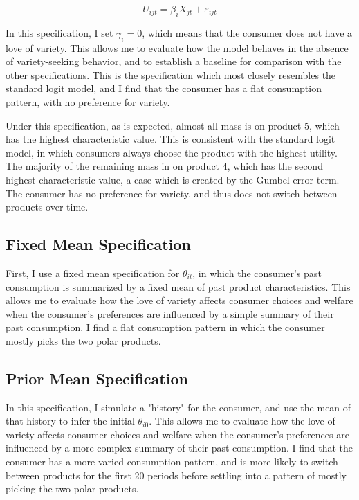 \documentclass[12pt]{article}
\begin{document}
    \begin{equation}
      U_{ijt} = \beta_i X_{jt} + \varepsilon_{ijt}
    \end{equation}

    In this specification, I set $\gamma_i = 0$, which means that the consumer does not have a love of variety. This allows me to evaluate how the model behaves in the absence of variety-seeking behavior, and to establish a baseline for comparison with the other specifications. This is the specification which most closely resembles the standard logit model, and I find that the consumer has a flat consumption pattern, with no preference for variety.

    Under this specification, as is expected, almost all mass is on product 5, which has the highest characteristic value. This is consistent with the standard logit model, in which consumers always choose the product with the highest utility. The majority of the remaining mass in on product 4, which has the second highest characteristic value, a case which is created by the Gumbel error term. The consumer has no preference for variety, and thus does not switch between products over time.

    \subsection{Fixed Mean Specification}
    First, I use a fixed mean specification for $\theta_{it}$, in which the consumer's past consumption is summarized by a fixed mean of past product characteristics. This allows me to evaluate how the love of variety affects consumer choices and welfare when the consumer's preferences are influenced by a simple summary of their past consumption. I find a flat consumption pattern in which the consumer mostly picks the two polar products.

    \subsection{Prior Mean Specification}
    In this specification, I simulate a "history" for the consumer, and use the mean of that history to infer the initial $\theta_{i0}$. This allows me to evaluate how the love of variety affects consumer choices and welfare when the consumer's preferences are influenced by a more complex summary of their past consumption. I find that the consumer has a more varied consumption pattern, and is more likely to switch between products for the first 20 periods before settling into a pattern of mostly picking the two polar products.
\end{document}

